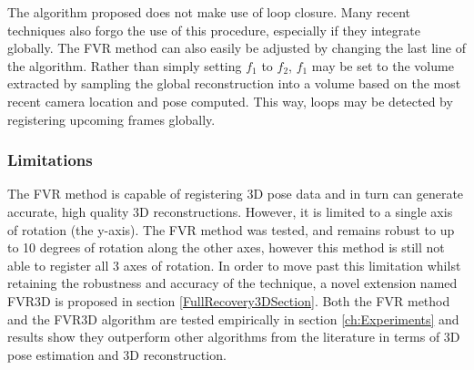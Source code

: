 The algorithm proposed does not make use of loop closure. Many recent techniques also forgo the use of this procedure, especially if they integrate globally. The FVR method can also easily be adjusted by changing the last line of the algorithm. Rather than simply setting $f_1$ to $f_2$, $f_1$ may be set to the volume extracted by sampling the global reconstruction into a volume based on the most recent camera location and pose computed. This way, loops may be detected by registering upcoming frames globally. \\


\subsubsection{Limitations}

The FVR method is capable of registering 3D pose data and in turn can generate accurate, high quality 3D reconstructions. However, it is limited to a single axis of rotation (the y-axis). The FVR method was tested, and remains robust to up to 10 degrees of rotation along the other axes, however this method is still not able to register all 3 axes of rotation. In order to move past this limitation whilst retaining the robustness and accuracy of the technique, a novel extension named FVR3D is proposed in section \ref{FullRecovery3DSection}. Both the FVR method and the FVR3D algorithm are tested empirically in section \ref{ch:Experiments} and results show they outperform other algorithms from the literature in terms of 3D pose estimation and 3D reconstruction. \\